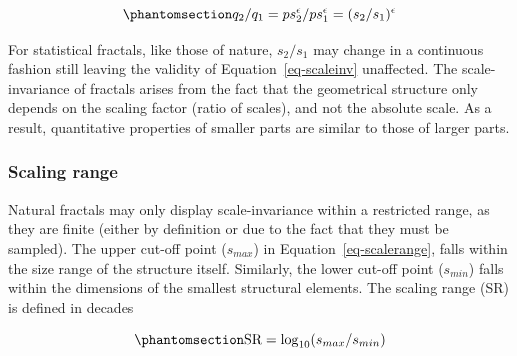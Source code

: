 \documentclass[
  sn-vancouver,
  Numbered,
  referee,
  lineno]{sn-jnl}
\begin{document}
\begin{equation}\phantomsection\label{eq-scaleinv}{
q_{2}/q_{1} = ps_2^\epsilon / ps_1^\epsilon = (s_2 / s_1)^\epsilon
}\end{equation}

For statistical fractals, like those of nature, \(s_2/s_1\) may change
in a continuous fashion still leaving the validity of
Equation~\ref{eq-scaleinv} unaffected. The scale-invariance of fractals
arises from the fact that the geometrical structure only depends on the
scaling factor (ratio of scales), and not the absolute scale. As a
result, quantitative properties of smaller parts are similar to those of
larger parts.

\subsubsection{Scaling range}\label{scaling-range}

Natural fractals may only display scale-invariance within a restricted
range, as they are finite (either by definition or due to the fact that
they must be sampled). The upper cut-off point (\(s_{max}\)) in
Equation~\ref{eq-scalerange}, falls within the size range of the
structure itself. Similarly, the lower cut-off point (\(s_{min}\)) falls
within the dimensions of the smallest structural elements. The scaling
range (SR) is defined in decades

\begin{equation}\phantomsection\label{eq-scalerange}{
\text{SR} = \log_{10}(s_{max}/s_{min})
}\end{equation}
\end{document}
